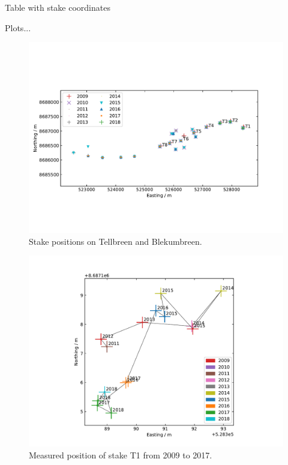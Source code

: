 
Table with stake coordinates

Plots...




\begin{figure}[H]
    \centering
    \includegraphics[width=\textwidth]{../fig/stakePositions.pdf}
    \caption{Stake positions on Tellbreen and Blekumbreen.}
    \label{GF:fig:stakepos}
\end{figure}



\begin{figure}[H]
    \centering
    \includegraphics[width=\textwidth]{../fig/T1_2d.pdf}
    \caption{Measured position of stake T1 from 2009 to 2017.}
    \label{GF:fig:stakepos}
\end{figure}
